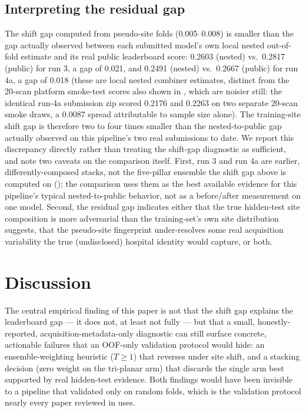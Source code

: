 \documentclass[10pt]{article}
\begin{document}
\subsection{Interpreting the residual gap}

The shift gap computed from pseudo-site folds (0.005--0.008) is smaller than the gap actually observed between each submitted model's own local nested out-of-fold estimate and its real public leaderboard score: 0.2603 (nested) vs.\ 0.2817 (public) for run 3, a gap of 0.021, and 0.2491 (nested) vs.\ 0.2667 (public) for run 4a, a gap of 0.018 (these are local nested combiner estimates, distinct from the 20-scan platform smoke-test scores also shown in , which are noisier still: the identical run-4a submission zip scored 0.2176 and 0.2263 on two separate 20-scan smoke draws, a 0.0087 spread attributable to sample size alone). The training-site shift gap is therefore two to four times smaller than the nested-to-public gap actually observed on this pipeline's two real submissions to date. We report this discrepancy directly rather than treating the shift-gap diagnostic as sufficient, and note two caveats on the comparison itself. First, run 3 and run 4a are earlier, differently-composed stacks, not the five-pillar ensemble the shift gap above is computed on (); the comparison uses them as the best available evidence for this pipeline's typical nested-to-public behavior, not as a before/after measurement on one model. Second, the residual gap indicates either that the true hidden-test site composition is more adversarial than the training-set's own site distribution suggests, that the pseudo-site fingerprint under-resolves some real acquisition variability the true (undisclosed) hospital identity would capture, or both.

\section{Discussion}
\label{sec:discussion}

The central empirical finding of this paper is not that the shift gap explains the leaderboard gap --- it does not, at least not fully --- but that a small, honestly-reported, acquisition-metadata-only diagnostic can still surface concrete, actionable failures that an OOF-only validation protocol would hide: an ensemble-weighting heuristic ($T \geq 1$) that reverses under site shift, and a stacking decision (zero weight on the tri-planar arm) that discards the single arm best supported by real hidden-test evidence. Both findings would have been invisible to a pipeline that validated only on random folds, which is the validation protocol nearly every paper reviewed in  uses.
\end{document}
